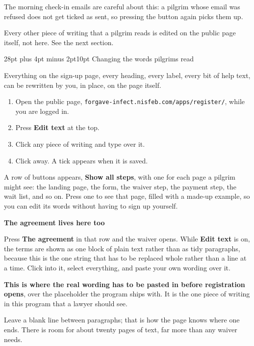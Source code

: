 \documentclass[12pt]{article}
\makeatletter
\renewcommand\section{\@startsection{section}{1}{0pt}%
  {28pt plus 4pt minus 2pt}{10pt}%
  {\normalfont\Large\bfseries\color{accent}}}
\newcommand{\notecolour}{softbg}
\newenvironment{note}[2][softbg]
  {\renewcommand{\notecolour}{#1}%
   \par\medskip
   \setlength{\fboxsep}{11pt}%
   \begin{lrbox}{\notebox}%
   \begin{minipage}{\dimexpr\linewidth-2\fboxsep\relax}%
   \setlength{\parskip}{7pt}%
   \textbf{#2}\par}
  {\end{minipage}%
   \end{lrbox}%
   \noindent\expandafter\colorbox\expandafter{\notecolour}{\usebox{\notebox}}%
   \par\medskip}
\newcommand{\btn}[1]{\textbf{#1}}
\makeatother
\begin{document}
The morning check-in emails are careful about this: a pilgrim whose
email was refused does not get ticked as sent, so pressing the button
again picks them up.

Every other piece of writing that a pilgrim reads is edited on the
public page itself, not here. See the next section.

\section{Changing the words pilgrims read}

Everything on the sign-up page, every heading, every label, every bit of
help text, can be rewritten by you, in place, on the page itself.

\begin{enumerate}[leftmargin=*,itemsep=6pt]
\item Open the public page, \texttt{forgave-infect.nisfeb.com/apps/register/}, while you are logged
  in.
\item Press \btn{Edit text} at the top.
\item Click any piece of writing and type over it.
\item Click away. A tick appears when it is saved.
\end{enumerate}

A row of buttons appears, \btn{Show all steps}, with one for each page a
pilgrim might see: the landing page, the form, the waiver step, the
payment step, the wait list, and so on. Press one to see that page,
filled with a made-up example, so you can edit its words without having
to sign up yourself.

\begin{note}[warnbg]{The agreement lives here too}
Press \btn{The agreement} in that row and the waiver opens. While
\btn{Edit text} is on, the terms are shown as one block of plain text
rather than as tidy paragraphs, because this is the one string that has
to be replaced whole rather than a line at a time. Click into it, select
everything, and paste your own wording over it.

\textbf{This is where the real wording has to be pasted in before
registration opens}, over the placeholder the program ships with. It is
the one piece of writing in this program that a lawyer should see.

Leave a blank line between paragraphs; that is how the page knows where
one ends. There is room for about twenty pages of text, far more than
any waiver needs.
\end{note}
\end{document}
